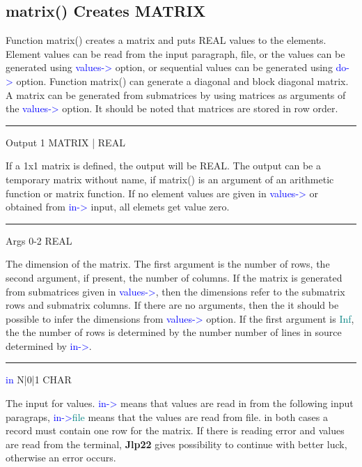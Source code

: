 \subsection{\textcolor{VioletRed}{matrix}() Creates MATRIX}
\label{matrix}
Function \textcolor{VioletRed}{matrix}() creates a matrix and puts REAL values to the elements. Element values
can be read from the input paragraph, file, or the values can be generated
using \textcolor{blue}{values->} option, or sequential values can be generated
using \textcolor{blue}{do->} option. Function \textcolor{VioletRed}{matrix}() can generate a diagonal and block diagonal matrix.
A matrix can be generated from submatrices by using matrices as arguments
of the  \textcolor{blue}{values->} option. It should be noted that matrices are stored in row order.
\vspace{0.3cm}
\hrule
\vspace{0.3cm}
\noindent Output \tabto{3cm}  1 \tabto{5cm}   MATRIX | REAL \tabto{7cm}
\begin{changemargin}{3cm}{0cm}
\noindent  If a 1x1 matrix is defined, the output will be REAL.
The output can be a temporary matrix without name, if \textcolor{VioletRed}{matrix}() is an argument
of an arithmetic function  or matrix function. If no element values are
given in \textcolor{blue}{values->} or obtained from \textcolor{blue}{in->} input, all elemets get value zero.
\end{changemargin}
\vspace{0.3cm}
\hrule
\vspace{0.3cm}
\noindent Args \tabto{3cm} 0-2 \tabto{5cm}  REAL \tabto{7cm}
\begin{changemargin}{3cm}{0cm}
\noindent  The dimension of the matrix. The first argument is the number of rows,
the second argument, if present, the number of columns.  If the matrix is generated from submatrices given in \textcolor{blue}{values->}, then the dimensions
refer to the submatrix rows and submatrix columns. If there are no arguments, then the
it should be possible to infer the dimensions from \textcolor{blue}{values->} option. If the
first argument is \textcolor{teal}{Inf}, the the number of rows is determined by the number
number of lines in source determined by \textcolor{blue}{in->}.
\end{changemargin}
\vspace{0.3cm}
\hrule
\vspace{0.3cm}
\noindent \textcolor{blue}{in} \tabto{3cm} N|0|1 \tabto{5cm}  CHAR \tabto{7cm}
\begin{changemargin}{3cm}{0cm}
\noindent  The input for values. \textcolor{blue}{in->} means that values are read in from
the following input paragraps, \textcolor{blue}{in->}\textcolor{teal}{file} means that the values are read from file.
in both cases a record must contain one row for the matrix.
If there is reading error and values are read from the terminal, \textbf{Jlp22} gives
possibility to continue with better luck, otherwise an error occurs.
\end{changemargin}
